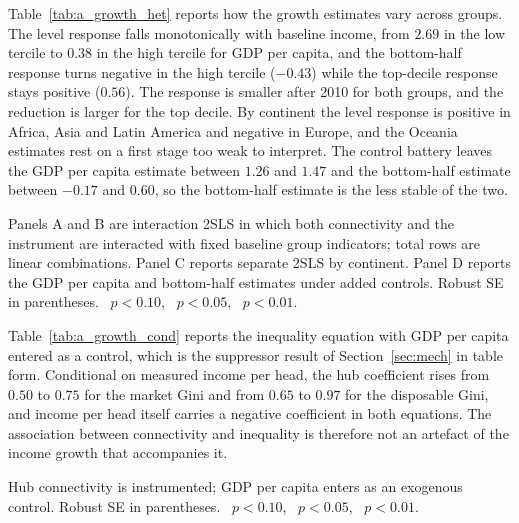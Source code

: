 Table~\ref{tab:a_growth_het} reports how the growth estimates vary across groups. The level response falls monotonically with baseline income, from $2.69$ in the low tercile to $0.38$ in the high tercile for GDP per capita, and the bottom-half response turns negative in the high tercile ($-0.43$) while the top-decile response stays positive ($0.56$). The response is smaller after 2010 for both groups, and the reduction is larger for the top decile. By continent the level response is positive in Africa, Asia and Latin America and negative in Europe, and the Oceania estimates rest on a first stage too weak to interpret. The control battery leaves the GDP per capita estimate between $1.26$ and $1.47$ and the bottom-half estimate between $-0.17$ and $0.60$, so the bottom-half estimate is the less stable of the two.

\begin{table}[H]\centering\caption{Growth outcomes: heterogeneity and control sensitivity.}\label{tab:a_growth_het}
\begin{threeparttable}\small
\begin{tablenotes}\footnotesize\item Panels A and B are interaction 2SLS in which both connectivity and the instrument are interacted with fixed baseline group indicators; total rows are linear combinations. Panel C reports separate 2SLS by continent. Panel D reports the GDP per capita and bottom-half estimates under added controls. Robust SE in parentheses. \sym{*}~$p<0.10$, \sym{**}~$p<0.05$, \sym{***}~$p<0.01$.\end{tablenotes}\end{threeparttable}\end{table}

Table~\ref{tab:a_growth_cond} reports the inequality equation with GDP per capita entered as a control, which is the suppressor result of Section~\ref{sec:mech} in table form. Conditional on measured income per head, the hub coefficient rises from $0.50$ to $0.75$ for the market Gini and from $0.65$ to $0.97$ for the disposable Gini, and income per head itself carries a negative coefficient in both equations. The association between connectivity and inequality is therefore not an artefact of the income growth that accompanies it.

\begin{table}[H]\centering\caption{Inequality conditional on measured income per head (2SLS, Feyrer instrument).}\label{tab:a_growth_cond}
\begin{threeparttable}\small
\begin{tablenotes}\footnotesize\item Hub connectivity is instrumented; GDP per capita enters as an exogenous control. Robust SE in parentheses. \sym{*}~$p<0.10$, \sym{**}~$p<0.05$, \sym{***}~$p<0.01$.\end{tablenotes}\end{threeparttable}\end{table}

